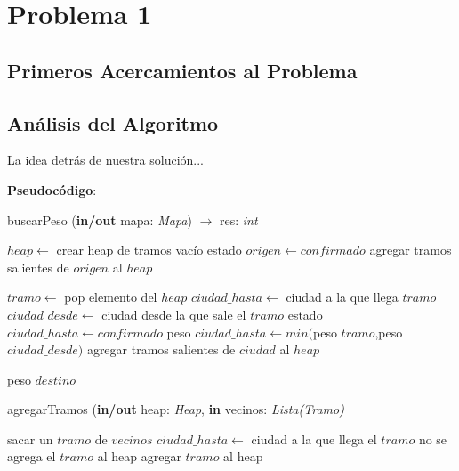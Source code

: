 \section{Problema 1}


\subsection{Primeros Acercamientos al Problema}


\subsection{Análisis del Algoritmo}

\indent La idea detrás de nuestra solución...

\textbf{Pseudocódigo}:

\begin{algorithm}
\caption{buscarPeso (\textbf{in/out} mapa: \textsl{Mapa}) $\rightarrow$ res: \textsl{int}}
\begin{algorithmic}[1]

\STATE $heap \leftarrow$ crear heap de tramos vacío
\STATE estado $origen \leftarrow confirmado$
\STATE agregar tramos salientes de $origen$ al $heap$

	\STATE $tramo \leftarrow$ pop elemento del $heap$
	\STATE $ciudad\_hasta \leftarrow$ ciudad a la que llega $tramo$
	\STATE $ciudad\_desde \leftarrow$ ciudad desde la que sale el $tramo$
	\STATE estado $ciudad\_hasta \leftarrow confirmado$
	\STATE peso $ciudad\_hasta \leftarrow min($peso $tramo$,peso $ciudad\_desde)$
	\STATE agregar tramos salientes de $ciudad$ al $heap$
	
\ENDWHILE
\RETURN peso $destino$  
\end{algorithmic}
\end{algorithm}

\begin{algorithm}
\caption{agregarTramos (\textbf{in/out} heap: \textsl{Heap}, \textbf{in} vecinos: \textsl{Lista(Tramo)}}
\begin{algorithmic}[1]

	\STATE sacar un $tramo$ de $vecinos$
	\STATE $ciudad\_hasta \leftarrow$ ciudad a la que llega el $tramo$
		\STATE no se agrega el $tramo$ al heap
	\ELSE 
		\STATE agregar $tramo$ al heap
	\ENDIF
\ENDWHILE
\end{algorithmic}
\end{algorithm}

